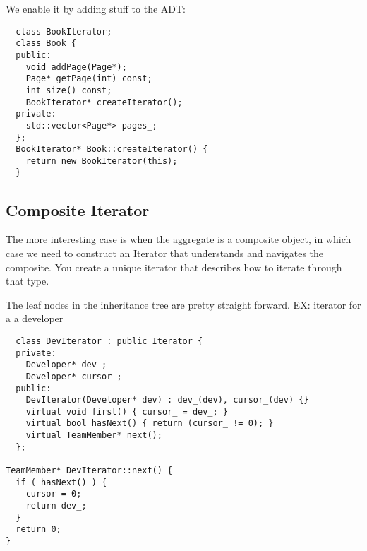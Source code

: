 \documentclass[12pt]{article}
\begin{document}
We enable it by adding stuff to the ADT:
\begin{lstlisting}
  class BookIterator;
  class Book {
  public:
    void addPage(Page*);
    Page* getPage(int) const;
    int size() const;
    BookIterator* createIterator();
  private:
    std::vector<Page*> pages_;
  };
  BookIterator* Book::createIterator() {
    return new BookIterator(this);
  }
\end{lstlisting}

\subsection*{Composite Iterator}
The more interesting case is when the aggregate is a composite object, in which case we need to construct an Iterator that understands and navigates the composite. You create a unique iterator that describes how to iterate through that type.

The leaf nodes in the inheritance tree are pretty straight forward.
EX: iterator for a a developer
\begin{lstlisting}
  class DevIterator : public Iterator {
  private:
    Developer* dev_;
    Developer* cursor_;
  public:
    DevIterator(Developer* dev) : dev_(dev), cursor_(dev) {}
    virtual void first() { cursor_ = dev_; }
    virtual bool hasNext() { return (cursor_ != 0); }
    virtual TeamMember* next();
  };

TeamMember* DevIterator::next() {
  if ( hasNext() ) {
    cursor = 0;
    return dev_;
  }
  return 0;
}
\end{lstlisting}
\end{document}
